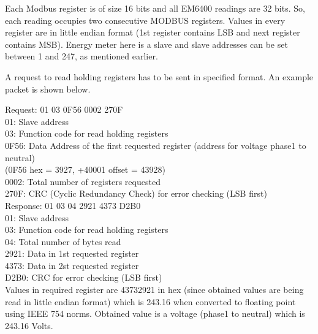 Each Modbus register is of size 16 bits and all EM6400 readings are 32 bits. So, each reading occupies two consecutive MODBUS  registers. Values in every register are in little endian format (1st register contains LSB and next register contains MSB). Energy meter here is a slave and slave addresses can be set between 1 and 247, as mentioned earlier.

A request to read holding registers has to be sent in specified format. An example packet is shown below. 

Request: 01 03 0F56 0002 270F\\
01: Slave address \\
03: Function code for read holding registers \\
0F56: Data Address of the first requested register (address for voltage phase1 to neutral) \\
(0F56 hex = 3927, +40001 offset = 43928) \\
0002: Total number of registers requested \\
270F: CRC (Cyclic Redundancy Check) for error checking (LSB first) \\


Response: 01 03 04 2921 4373 D2B0\\
01: Slave address \\
03: Function code for read holding registers \\
04: Total number of bytes read   \\
2921: Data in 1st requested register \\
4373: Data in 2st requested register \\
D2B0: CRC for error checking (LSB first) \\

Values in required register are 43732921 in hex (since obtained values are being read in little endian format) which is 243.16 when converted to floating point using IEEE 754 norms. Obtained value is a voltage (phase1 to neutral) which is 243.16 Volts. 

